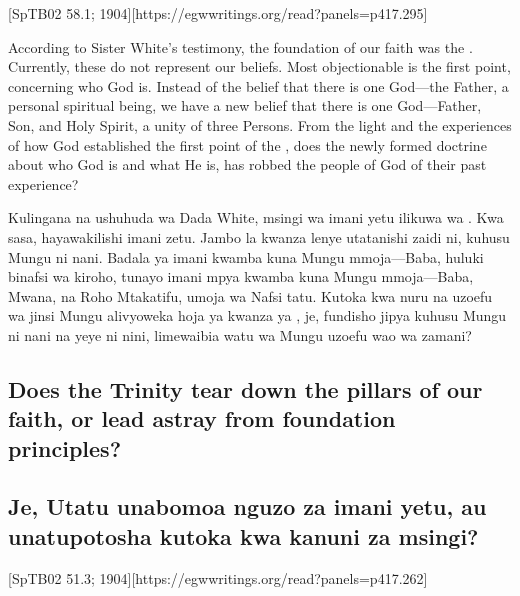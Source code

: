 [SpTB02 58.1; 1904][https://egwwritings.org/read?panels=p417.295]


According to Sister White’s testimony, the foundation of our faith was the . Currently, these do not represent our beliefs. Most objectionable is the first point, concerning who God is. Instead of the belief that there is one God—the Father, a personal spiritual being, we have a new belief that there is one God—Father, Son, and Holy Spirit, a unity of three Persons. From the light and the experiences of how God established the first point of the , does the newly formed doctrine about who God is and what He is, has robbed the people of God of their past experience?


Kulingana na ushuhuda wa Dada White, msingi wa imani yetu ilikuwa wa . Kwa sasa, hayawakilishi imani zetu. Jambo la kwanza lenye utatanishi zaidi ni, kuhusu Mungu ni nani. Badala ya imani kwamba kuna Mungu mmoja—Baba, huluki binafsi wa kiroho, tunayo imani mpya kwamba kuna Mungu mmoja—Baba, Mwana, na Roho Mtakatifu, umoja wa Nafsi tatu. Kutoka kwa nuru na uzoefu wa jinsi Mungu alivyoweka hoja ya kwanza ya , je, fundisho jipya kuhusu Mungu ni nani na yeye ni nini, limewaibia watu wa Mungu uzoefu wao wa zamani?


\subsection*{Does the Trinity tear down the pillars of our faith, or lead astray from foundation principles?}


\subsection*{Je, Utatu unabomoa nguzo za imani yetu, au unatupotosha kutoka kwa kanuni za msingi?}


[SpTB02 51.3; 1904][https://egwwritings.org/read?panels=p417.262]


